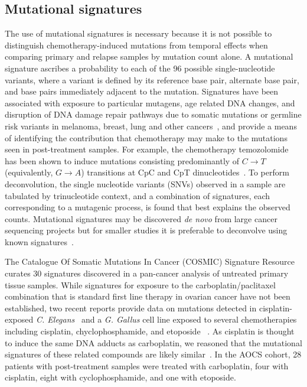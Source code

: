 \documentclass[linenumbers]{bmcart}
\begin{document}
\subsection*{Mutational signatures}
The use of mutational signatures is necessary because it is not possible to distinguish chemotherapy-induced mutations from temporal effects when comparing primary and relapse samples by mutation count alone. A mutational signature ascribes a probability to each of the 96 possible single-nucleotide variants, where a variant is defined by its reference base pair, alternate base pair, and base pairs immediately adjacent to the mutation. Signatures have been associated with exposure to particular mutagens, age related DNA changes, and disruption of DNA damage repair pathways due to somatic mutations or germline risk variants in melanoma, breast, lung and other cancers~\cite{Alexandrov2013}, and provide a means of identifying the contribution that chemotherapy may make to the mutations seen in post-treatment samples. For example, the chemotherapy temozolomide has been shown to induce mutations consisting predominantly of $C \rightarrow T$ (equivalently, $G \rightarrow A$) transitions at CpC and CpT dinucleotides~\cite{Johnson_2013}. To perform deconvolution, the single nucleotide variants (SNVs) observed in a sample are tabulated by trinucleotide context, and a combination of signatures, each corresponding to a mutagenic process, is found that best explains the observed counts. Mutational signatures may be discovered \textit{de novo} from large cancer sequencing projects but for smaller studies it is preferable to deconvolve using known signatures~\cite{Rosenthal_2016}.

The Catalogue Of Somatic Mutations In Cancer (COSMIC) Signature Resource curates 30 signatures discovered in a pan-cancer analysis of untreated primary tissue samples. While signatures for exposure to the carboplatin/paclitaxel combination that is standard first line therapy in ovarian cancer have not been established, two recent reports provide data on mutations detected in cisplatin-exposed \textit{C. Elegans}~\cite{Meier_2014} and a \textit{G. Gallus} cell line exposed to several chemotherapies including cisplatin, chyclophosphamide, and etoposide ~\cite{Szikriszt_2016}. As cisplatin is thought to induce the same DNA adducts as carboplatin, we reasoned that the mutational signatures of these related compounds are likely similar~\cite{Atsushi19941009}. In the AOCS cohort, 28 patients with post-treatment samples were treated with carboplatin, four with cisplatin, eight with cyclophosphamide, and one with etoposide.
\end{document}
